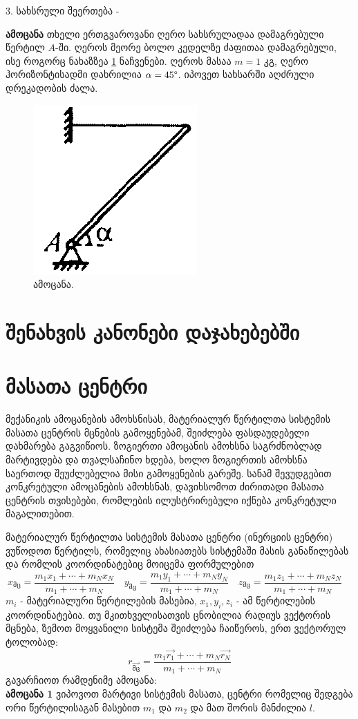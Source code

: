 \documentclass{book}
\begin{document}
3. სახსრული შეერთება - 


\textbf{ამოცანა} თხელი ერთგვაროვანი ღერო სახსრულადაა დამაგრებული წერტილ $A$-ში. ღეროს მეორე ბოლო კედელზე ძაფითაა დამაგრებული, ისე როგორც ნახაზზეა \ref{fig:statics_1}  ნაჩვენები. ღეროს მასაა $m = 1$ კგ, ღერო ჰორიზონტისადმი დახრილია $\alpha = 45 \degree$. იპოვეთ სახსარში აღძრული დრეკადობის ძალა. 
	 	\begin{figure}[H]
	 	   \centering
           \includegraphics[width=0.2\columnwidth]{figures/statics_1}
           \caption{ამოცანა.}
           \label{fig:statics_1}
        \end{figure}

\section{შენახვის კანონები დაჯახებებში}

\section{მასათა ცენტრი}
მექანიკის ამოცანების ამოხსნისას, მატერიალურ წერტილთა სისტემის მასათა ცენტრის მცნების გამოყენებამ, შეიძლება ფასდაუდებელი დახმარება გაგვიწიოს. ზოგიერთი ამოცანის ამოხსნა საგრძნობლად მარტივდება და თვალსაჩინო ხდება, ხოლო ზოგიერთის ამოხსნა საერთოდ შეუძლებელია მისი გამოყენების გარეშე. სანამ შევუდგებით კონკრეტული ამოცანების ამოხსნას, დავიხსომოთ ძირითადი მასათა ცენტრის თვისებები, რომლების ილუსტრირებული იქნება კონკრეტული მაგალითებით.

მატერიალურ წერტილთა სისტემის მასათა ცენტრი (ინერციის ცენტრი) ვუწოდოთ წერტილს, რომელიც ახასიათებს სისტემაში მასის განაწილებას და რომლის კოორდინატებიც მოიცემა ფორმულებით
	\begin{equation}
		x_{\text{მც}} = \frac{m_1x_1 + \dotsb + m_Nx_N}{m_1 + \dotsb + m_N} \quad
		y_{\text{მც}} = \frac{m_1y_1 + \dotsb + m_Ny_N}{m_1 + \dotsb + m_N} \quad
		z_{\text{მც}} = \frac{m_1z_1 + \dotsb + m_Nz_N}{m_1 + \dotsb + m_N} \quad
	\end{equation}
$m_i$ - მატერიალური წერტილების მასებია, $x_1,y_i,z_i$ - ამ წერტილების კოორდინატებია. თუ მკითხველისათვის ცნობილია რადიუს ვექტორის მცნება, ზემოთ მოყვანილი სისტემა შეიძლება ჩაიწეროს, ერთ ვექტორულ ტოლობად:
	\begin{equation}
		r_{\vec{\text{მც}}} = \frac{m_1\vec{r_1} + \dotsb + m_N\vec{r_N}}{m_1 + \dotsb + m_N}
	\end{equation}
გავარჩიოთ რამდენიმე ამოცანა:\\
\textbf{ამოცანა 1} ვიპოვოთ მარტივი სისტემის მასათა, ცენტრი რომელიც შედგება ორი წერტილისაგან მასებით $m_1$ და $m_2$ და მათ შორის მანძილია $l$.
\end{document}
